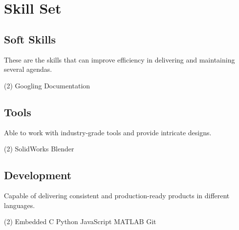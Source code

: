 \section*{Skill Set}
%
%
%
\subsection*{Soft Skills}
These are the skills that can improve efficiency in delivering and maintaining several agendas.
\vspace{0mm}
\begin{tasks}(2)
  \task Googling
  \task Documentation
\end{tasks}
%
%
\subsection*{Tools}
Able to work with industry-grade tools and provide intricate designs.
\vspace{2mm}
\begin{tasks}(2)
  \task SolidWorks
  \task Blender
\end{tasks}
%
%
\subsection*{Development}
Capable of delivering consistent and production-ready products in
different languages.
\vspace{2mm}
\begin{tasks}(2)
  \task Embedded C
  \task Python
  \task JavaScript
  \task MATLAB
  \task Git
\end{tasks}
